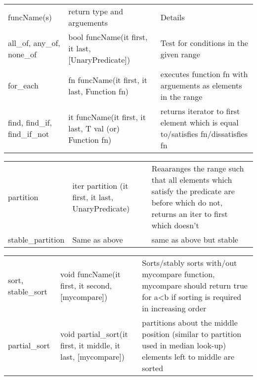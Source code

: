

\begin{tabular}{p{2cm}|p{5cm}|p{5.5cm}}
	funcName(s)	&	return type and arguements	&	Details	\\
	all\_of, any\_of, none\_of	& bool funcName(it first, it last, [UnaryPredicate])	&	Test for conditions in the given range	\\
	for\_each 	&	fn funcName(it first, it last, Function fn) &	executes function fn with arguements as elements in the range \\
	find, find\_if, find\_if\_not	&	it funcName(it first, it last, T val (or) Function fn)	&	returns iterator to first element which is equal to/satisfies fn/dissatisfies fn \\

\end{tabular}



\begin{tabular}{p{2cm}|p{5cm}|p{5.5cm}}
    partition   &   iter partition (it first, it last, UnaryPredicate)  &   Reaaranges the range such that all elements which satisfy the predicate are before which do not, returns an iter to first which doesn't \\
    stable\_partition    &   Same as above   &   same as above but stable \\
\end{tabular}


\begin{tabular}{p{2cm}|p{5cm}|p{5.5cm}}
    sort, stable\_sort   &   void funcName(it first, it second, [mycompare])   &   Sorts/stably sorts with/out mycompare function, mycompare should return true for a\textless b if sorting is required in increasing order \\
    partial\_sort    &   void partial\_sort(it first, it middle, it last, [mycompare])    &   partitions about the middle position (similar to partition used in median look-up) elements left to middle are sorted \\

\end{tabular}
